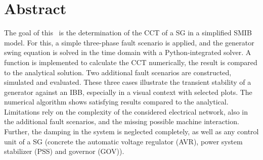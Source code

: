 
\cleardoublepage
\pagestyle{empty}




\section*{Abstract}

The goal of this \arbeit~is the determination of the \acf{CCT} of a \acf{SG} in a simplified \acf{SMIB} model. For this, a simple three-phase fault scenario is applied, and the generator swing equation is solved in the time domain with a Python-integrated solver. A function is implemented to calculate the \acs{CCT} numerically, the result is compared to the analytical solution. Two additional fault scenarios are constructed, simulated and evaluated. These three cases illustrate the transient stability of a generator against an \acf{IBB}, especially in a visual context with selected plots. The numerical algorithm shows satisfying results compared to the analytical. Limitations rely on the complexity of the considered electrical network, also in the additional fault scenarios, and the missing possible machine interaction. Further, the damping in the system is neglected completely, as well as any control unit of a \acs{SG} (concrete the automatic voltage regulator (AVR), power system stabilizer (PSS) and governor (GOV)).

